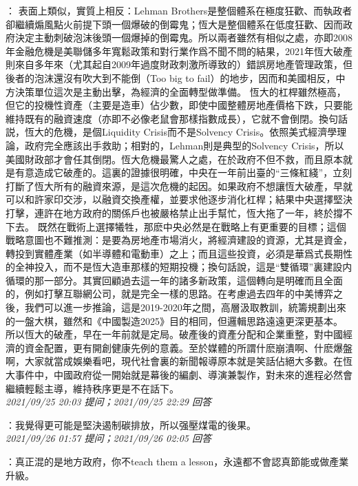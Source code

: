 \documentclass[twocolumn]{ctexart}
\begin{document}
：
表面上類似，實質上相反：Lehman Brothers是整個體系在極度狂歡、而執政者卻繼續煽風點火前提下頭一個爆破的倒霉鬼；恆大是整個體系在低度狂歡、因而政府決定主動刺破泡沫後頭一個爆掉的倒霉鬼。所以兩者雖然有相似之處，亦即2008年金融危機是美聯儲多年寬鬆政策和對行業作爲不聞不問的結果，2021年恆大破產則來自多年來（尤其起自2009年過度財政刺激所導致的）錯誤房地產管理政策，但後者的泡沫還沒有吹大到不能倒（Too big to fail）的地步，因而和美國相反，中方決策單位這次是主動出擊，為經濟的全面轉型做準備。
恆大的杠桿雖然極高，但它的投機性資產（主要是造車）佔少數，即使中國整體房地產價格下跌，只要能維持既有的融資速度（亦即不必像老鼠會那樣指數成長），它就不會倒閉。換句話説，恆大的危機，是個Liquidity Crisis而不是Solvency Crisis。依照美式經濟學理論，政府完全應該出手救助；相對的，Lehman則是典型的Solvency Crisis，所以美國財政部才會任其倒閉。恆大危機最驚人之處，在於政府不但不救，而且原本就是有意造成它破產的。這裏的證據很明確，中央在一年前出臺的“三條紅綫”，立刻打斷了恆大所有的融資來源，是這次危機的起因。如果政府不想讓恆大破產，早就可以和許家印交涉，以融資交換產權，並要求他逐步消化杠桿；結果中央選擇堅決打擊，連許在地方政府的關係戶也被嚴格禁止出手幫忙，恆大拖了一年，終於撐不下去。
既然在戰術上選擇犧牲，那麽中央必然是在戰略上有更重要的目標；這個戰略意圖也不難推測：是要為房地產市場消火，將經濟建設的資源，尤其是資金，轉投到實體產業（如半導體和電動車）之上；而且這些投資，必須是華爲式長期性的全神投入，而不是恆大造車那樣的短期投機；換句話說，這是“雙循環”裏建設内循環的那一部分。其實回顧過去這一年的諸多新政策，這個轉向是明確而且全面的，例如打擊互聯網公司，就是完全一樣的思路。在考慮過去四年的中美博弈之後，我們可以進一步推論，這是2019-2020年之間，高層汲取教訓，統籌規劃出來的一盤大棋，雖然和《中國製造2025》目的相同，但邏輯思路遠遠更深更基本。
所以恆大的破產，早在一年前就是定局。破產後的資產分配和企業重整，對中國經濟的資金配置，更有開創健康先例的意義。至於媒體的所謂什麽崩潰啊、什麽爆盤啊，大家就當成娛樂看吧，現代社會裏的新聞報導原本就是笑話佔絕大多數。在恆大事件中，中國政府從一開始就是幕後的編劇、導演兼製作，對未來的進程必然會繼續輕鬆主導，維持秩序更是不在話下。
\\

\textit{\hfill\noindent\small 2021/09/25 20:03 提问；2021/09/25 22:29 回答}

：我覺得更可能是堅決遏制碳排放，所以强壓煤電的後果。
\\

\textit{\hfill\noindent\small 2021/09/26 01:57 提问；2021/09/26 02:05 回答}

：真正混的是地方政府，你不teach them a lesson，永遠都不會認真節能或做產業升級。
\\
\end{document}
